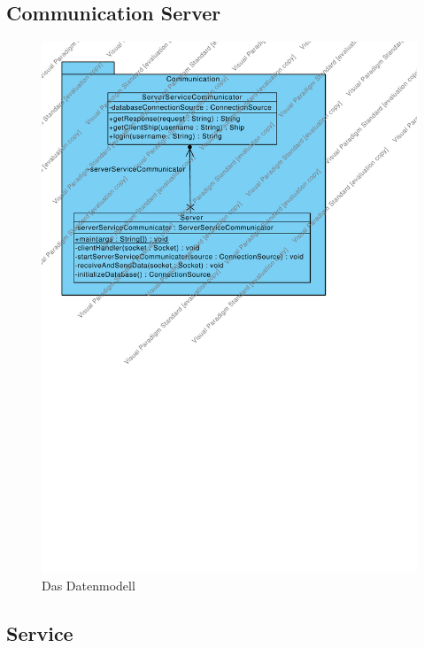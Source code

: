 \documentclass[fontsize=12pt,paper=a4,twoside]{scrartcl}
\begin{document}
\subsection{Communication Server}

\begin{figure}[H]
\begin{center}
  \includegraphics[width=\linewidth]{../GT_Modulsicht/src/CommServer.pdf}
    \caption{Das Datenmodell}
\end{center}
\end{figure}

\subsection{Service}
\end{document}
